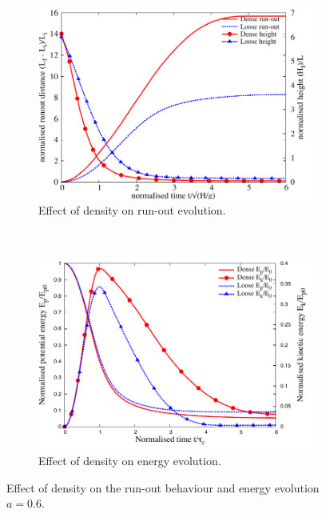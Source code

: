 \begin{figure}[tbhp]
\centering
\begin{subfigure}[b]{0.9\textwidth}
\includegraphics[width=\textwidth]{runout_height_dense_a6}
\caption{Effect of density on run-out evolution.}
\label{fig:runout_height_dense_a6}
\end{subfigure}
\\
\begin{subfigure}[b]{0.9\textwidth}
\centering
\includegraphics[width=\textwidth]{Energy_dense_a6}
\caption{Effect of density on energy evolution.}
\label{fig:Energy_dense_a6}
\end{subfigure}
\caption{Effect of density on the run-out behaviour and energy evolution $a = 
0.6$.}
\label{fig:Density_a6}
\end{figure}

